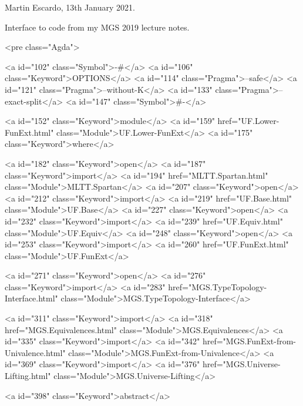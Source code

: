 Martin Escardo, 13th January 2021.

Interface to code from my MGS 2019 lecture notes.

<pre class="Agda">

<a id="102" class="Symbol">{-#</a> <a id="106" class="Keyword">OPTIONS</a> <a id="114" class="Pragma">--safe</a> <a id="121" class="Pragma">--without-K</a> <a id="133" class="Pragma">--exact-split</a> <a id="147" class="Symbol">#-}</a>

<a id="152" class="Keyword">module</a> <a id="159" href="UF.Lower-FunExt.html" class="Module">UF.Lower-FunExt</a> <a id="175" class="Keyword">where</a>

<a id="182" class="Keyword">open</a> <a id="187" class="Keyword">import</a> <a id="194" href="MLTT.Spartan.html" class="Module">MLTT.Spartan</a>
<a id="207" class="Keyword">open</a> <a id="212" class="Keyword">import</a> <a id="219" href="UF.Base.html" class="Module">UF.Base</a>
<a id="227" class="Keyword">open</a> <a id="232" class="Keyword">import</a> <a id="239" href="UF.Equiv.html" class="Module">UF.Equiv</a>
<a id="248" class="Keyword">open</a> <a id="253" class="Keyword">import</a> <a id="260" href="UF.FunExt.html" class="Module">UF.FunExt</a>

<a id="271" class="Keyword">open</a> <a id="276" class="Keyword">import</a> <a id="283" href="MGS.TypeTopology-Interface.html" class="Module">MGS.TypeTopology-Interface</a>

<a id="311" class="Keyword">import</a> <a id="318" href="MGS.Equivalences.html" class="Module">MGS.Equivalences</a>
<a id="335" class="Keyword">import</a> <a id="342" href="MGS.FunExt-from-Univalence.html" class="Module">MGS.FunExt-from-Univalence</a>
<a id="369" class="Keyword">import</a> <a id="376" href="MGS.Universe-Lifting.html" class="Module">MGS.Universe-Lifting</a>

<a id="398" class="Keyword">abstract</a>

